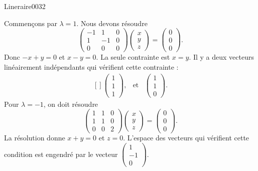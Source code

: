 \begin{corrige}{Lineraire0032}
\begin{enumerate}
	Commençons par $\lambda=1$. Nous devons résoudre
	\begin{equation}
		\begin{pmatrix}
			-1	&	1	&	0	\\
			1	&	-1	&	0	\\
			0	&	0	&	0
		\end{pmatrix}\begin{pmatrix}
			x	\\ 
			y	\\ 
			z	
		\end{pmatrix}=\begin{pmatrix}
			0	\\ 
			0	\\ 
			0	
		\end{pmatrix}.
	\end{equation}
	Donc $-x+y=0$ et $x-y=0$. La seule contrainte est $x=y$. Il y a deux vecteurs linéairement indépendants qui vérifient cette contrainte :
	\begin{equation}
		\begin{aligned}[]
			\begin{pmatrix}
				1	\\ 
				1	\\ 
				1	
			\end{pmatrix},&\text{et}&\begin{pmatrix}
				1	\\ 
				1	\\ 
				0	
			\end{pmatrix}.
		\end{aligned}
	\end{equation}
	Pour $\lambda=-1$, on doit résoudre
	\begin{equation}
		\begin{pmatrix}
			1	&	1	&	0	\\
			1	&	1	&	0	\\
			0	&	0	&	2
		\end{pmatrix}\begin{pmatrix}
			x	\\ 
			y	\\ 
			z	
		\end{pmatrix}=\begin{pmatrix}
			0	\\ 
			0	\\ 
			0	
		\end{pmatrix}.
	\end{equation}
	La résolution donne $x+y=0$ et $z=0$. L'espace des vecteurs qui vérifient cette condition est engendré par le vecteur $\begin{pmatrix}
		1	\\ 
		-1	\\ 
		0	
	\end{pmatrix}$.


\end{enumerate}
\end{corrige}
